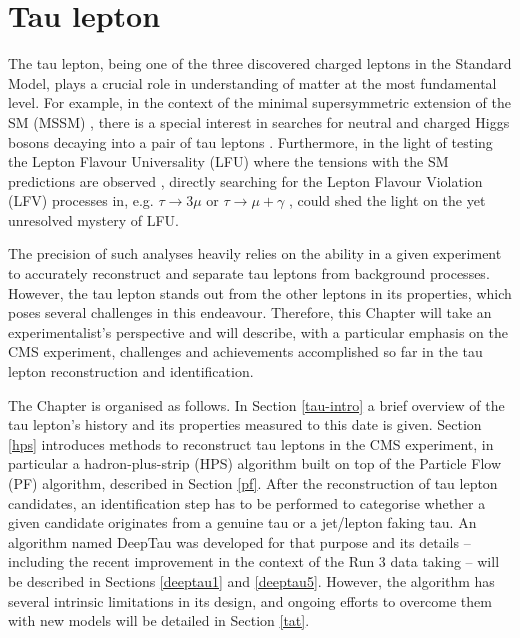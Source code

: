 \chapter{Tau lepton}

The tau lepton, being one of the three discovered charged leptons in the Standard Model, plays a crucial role in understanding of matter at the most fundamental level. For example, in the context of the minimal supersymmetric extension of the SM (MSSM) \cite{Fayet:1974pd, Fayet:1977yc}, there is a special interest in searches for neutral and charged Higgs bosons decaying into a pair of tau leptons \cite{CMS:2022goy}. Furthermore, in the light of testing the Lepton Flavour Universality (LFU) \cite{HFLAV:2022pwe} where the tensions with the SM predictions are observed \cite{Cheaib:2022ral, LHCb:2021trn}, directly searching for the Lepton Flavour Violation (LFV) processes in, e.g. $\tau \to 3\mu$ \cite{CMS:2020kwy} or $\tau \to \mu + \gamma$  \cite{Konno:2020tmf}, could shed the light on the yet unresolved mystery of LFU.

The precision of such analyses heavily relies on the ability in a given experiment to accurately reconstruct and separate tau leptons from background processes. However, the tau lepton stands out from the other leptons in its properties, which poses several challenges in this endeavour. Therefore, this Chapter will take an experimentalist’s perspective and will describe, with a particular emphasis on the CMS experiment, challenges and achievements accomplished so far in the tau lepton reconstruction and identification.

The Chapter is organised as follows. In Section \ref{tau-intro} a brief overview of the tau lepton’s history and its properties measured to this date is given. Section \ref{hps} introduces methods to reconstruct tau leptons in the CMS experiment, in particular a hadron-plus-strip (HPS) algorithm built on top of the Particle Flow (PF) algorithm, described in Section \ref{pf}. After the reconstruction of tau lepton candidates, an identification step has to be performed to categorise whether a given candidate originates from a genuine tau or a jet/lepton faking tau. An algorithm named DeepTau was developed for that purpose and its details -- including the recent improvement in the context of the Run 3 data taking -- will be described in Sections \ref{deeptau1} and \ref{deeptau5}. However, the algorithm has several intrinsic limitations in its design, and ongoing efforts to overcome them with new models will be detailed in Section \ref{tat}.

